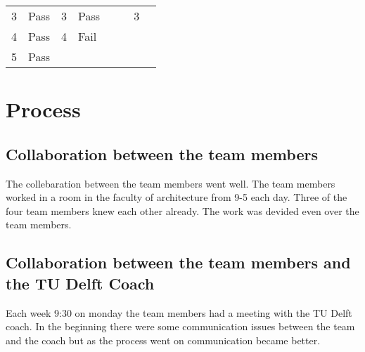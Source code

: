 \begin{table}[h]
\begin{tabular}{llllllll}
3                                                     & Pass                                                  & 3                                                       & Pass                                                  &                                                        &                                                       & 3                                                     &                                                       \\
4                                                     & Pass                                                  & 4                                                       & Fail                                                  &                                                        &                                                       &                                                       &                                                       \\
5                                                     & Pass                                                  &                                                         &                                                       &                                                        &                                                       &                                                       &                                                      
\end{tabular}
\end{table}

\section{Process}

\subsection{Collaboration between the team members}
The collebaration between the team members went well. The team members worked in a room in the faculty of architecture from 9-5 each day. Three of the four team members knew each other already. The work was devided even over the team members. 

\subsection{Collaboration between the team members and the TU Delft Coach}
Each week 9:30 on monday the team members had a meeting with the TU Delft coach. In the beginning there were some communication issues between the team and the coach but as the process went on communication became better.


